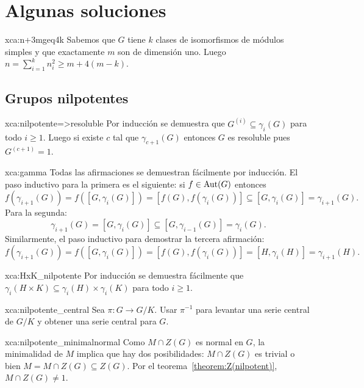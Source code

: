 \chapter*{Algunas soluciones}

\begin{sol}{xca:n+3mgeq4k}
     Sabemos que $G$ tiene $k$ clases de isomorfismos de módulos simples y que exactamente 
     $m$ son de dimensión uno. Luego $n=\sum_{i=1}^kn_i^2\geq m+4(m-k)$. 
\end{sol}

\section*{Grupos nilpotentes}

\begin{sol}{xca:nilpotente=>resoluble}
	Por inducción se demuestra que $G^{(i)}\subseteq\gamma_i(G)$ para todo
	$i\geq1$. Luego si existe $c$ tal que $\gamma_{c+1}(G)$ entonces $G$ es
	resoluble pues $G^{(c+1)}=1$.
\end{sol}

\begin{sol}{xca:gamma}
	Todas las afirmaciones se demuestran fácilmente por inducción. El paso
	inductivo para la primera es el siguiente: si $f\in\operatorname{Aut}(G)$ entonces
	\[
		f(\gamma_{i+1}(G))
		=f([G,\gamma_i(G)])
		=[f(G),f(\gamma_i(G))]\subseteq [G,\gamma_i(G)]
		=\gamma_{i+1}(G).
	\]
	Para la segunda:
	\[
		\gamma_{i+1}(G)=[G,\gamma_i(G)]\subseteq [G,\gamma_{i-1}(G)]=\gamma_{i}(G).
	\]
	Similarmente, el paso inductivo para demostrar la tercera afirmación:
	\[
		f(\gamma_{i+1}(G))=f([G,\gamma_i(G)])=[f(G),f(\gamma_i(G))]=[H,\gamma_i(H)]=\gamma_{i+1}(H).
	\]
\end{sol}

\begin{sol}{xca:HxK_nilpotente}
	Por inducción se demuestra fácilmente que $\gamma_i(H\times
	K)\subseteq\gamma_i(H)\times\gamma_i(K)$ para todo $i\geq1$. 
\end{sol}

\begin{sol}{xca:nilpotente_central}
	Sea $\pi\colon G\to G/K$. Usar $\pi^{-1}$ para levantar una serie central de $G/K$ y obtener una serie central para $G$.
\end{sol}

\begin{sol}{xca:nilpotente_minimalnormal}
 	Como $M\cap Z(G)$ es normal en $G$, la minimalidad de $M$ implica que hay
 	dos posibilidades: $M\cap Z(G)$ es trivial o bien $M=M\cap Z(G)\subseteq Z(G)$.
 	Por el teorema~\ref{theorem:Z(nilpotent)}, $M\cap Z(G)\ne 1$.
\end{sol}


